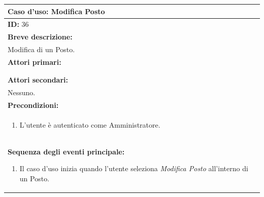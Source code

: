 \documentclass{article}
\begin{document}
                \begin{table}[H]
                    \begin{tabular}{|p{\linewidth}|}
                        \hline
                        \cellcolor{gray!100}
                        \color{white}
                        \centerline{\textbf{Caso d'uso:} Modifica Posto} \\
                        \hline
                        \textbf{ID:} 36 \\
                        \hline
                        \cellcolor{gray!20}
                        \textbf{Breve descrizione:} \\
                        \cellcolor{gray!20}
                        Modifica di un Posto. \\
                        \hline
                        \textbf{Attori primari:} \\
                        \begin{minipage}{\linewidth}
                            Amministratore \\ 
                        \end{minipage}
                        \vspace{-15pt} \\ 
                        \hline
                        \textbf{Attori secondari:} \\
                        Nessuno. \\
                        \hline
                        \cellcolor{gray!20}
                        \textbf{Precondizioni:} \\
                        \cellcolor{gray!20}
                        \begin{minipage}{\linewidth}
                            \begin{enumerate}
                                \item L'utente è autenticato come Amministratore.
                            \end{enumerate}
                        \end{minipage} \\
                        \hline
                        \textbf{Sequenza degli eventi principale:}
                        \begin{enumerate}
                            \item Il caso d'uso inizia quando l'utente seleziona \textit{Modifica Posto} all'interno di un Posto.

\end{enumerate}
\end{tabular}
\end{table}
\end{document}
